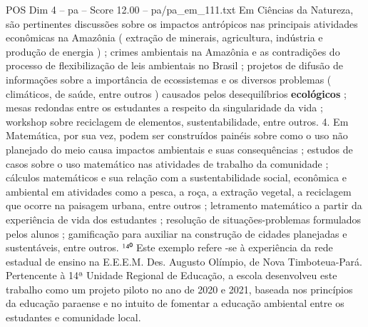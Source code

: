 \begin{textsample}{POS Dim 4 – pa – Score 12.00 – pa/pa\_em\_111.txt}
Em Ciências da Natureza, são pertinentes discussões sobre os impactos antrópicos nas principais atividades econômicas na Amazônia ( extração de minerais, agricultura, indústria e produção de energia ) ; crimes ambientais na Amazônia e as contradições do processo de flexibilização de leis ambientais no Brasil ; projetos de difusão de informações sobre a importância de ecossistemas e os diversos problemas ( climáticos, de saúde, entre outros ) causados pelos desequilíbrios \textbf{ecológicos} ; mesas redondas entre os estudantes a respeito da singularidade da vida ; workshop sobre reciclagem de elementos, sustentabilidade, entre outros. 4.
Em Matemática, por sua vez, podem ser construídos painéis sobre como o uso não planejado do meio causa impactos ambientais e suas consequências ; estudos de casos sobre o uso matemático nas atividades de trabalho da comunidade ; cálculos matemáticos e sua relação com a sustentabilidade social, econômica e ambiental em atividades como a pesca, a roça, a extração vegetal, a reciclagem que ocorre na paisagem urbana, entre outros ; letramento matemático a partir da experiência de vida dos estudantes ; resolução de situações-problemas formulados pelos alunos ; gamificação para auxiliar na construção de cidades planejadas e sustentáveis, entre outros. ¹⁴⁰ Este exemplo refere -se à experiência da rede estadual de ensino na E.E.E.M.
Des.
Augusto Olímpio, de Nova Timboteua-Pará.
Pertencente à 14ª Unidade Regional de Educação, a escola desenvolveu este trabalho como um projeto piloto no ano de 2020 e 2021, baseada nos princípios da educação paraense e no intuito de fomentar a educação ambiental entre os estudantes e comunidade local.

\end{textsample}

